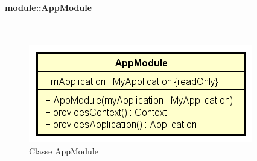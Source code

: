 \documentclass[../DefinizioneDiProdotto.tex]{subfiles}
\begin{document}
\paragraph{module::AppModule}
\
\begin{figure}[H]
	\centering
	\includegraphics[width=\maxwidth]{img/AppModule.png}
	\caption{Classe AppModule}\label{fig:module::AppModule} 
\end{figure}
\end{document}
